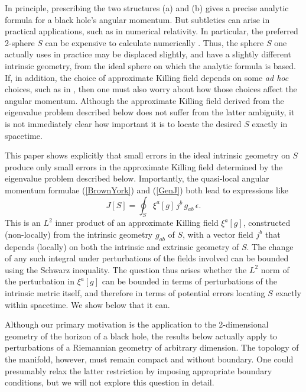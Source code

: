 \documentclass[12pt,letterpaper]{iopart}
\begin{document}
In principle, prescribing the two structures (a) and (b) gives a precise analytic formula for a black hole's angular momentum.  But subtleties can arise in practical applications, such as in numerical relativity.  In particular, the preferred 2-sphere $S$ can be expensive to calculate numerically \cite{Thornburg}.  Thus, the sphere $S$ one actually uses in practice may be displaced slightly, and have a slightly different intrinsic geometry, from the ideal sphere on which the analytic formula is based.  If, in addition, the choice of approximate Killing field depends on some \textit{ad hoc} choices, such as in \cite{Dreyer,Harte}, then one must also worry about how those choices  affect the angular momentum.  Although the approximate Killing field derived from the eigenvalue problem described below does not suffer from the latter ambiguity, it is not immediately clear how important it is to locate the desired $S$ exactly in spacetime.

This paper shows explicitly that small errors in the ideal intrinsic geometry on $S$ produce only small errors in the approximate Killing field determined by the eigenvalue problem described below.  Importantly, the quasi-local angular momentum formulae (\ref{BrownYork}) and (\ref{GenJ}) both lead to expressions like  
%
\begin{equation}
	J[S] = \oint_S \xi^a[g]\, j^b\, g_{ab}\, \epsilon.
\end{equation}
%
This is an $L^2$ inner product of an approximate Killing field $\xi^a[g]$, constructed (non-locally) from the intrinsic geometry $g_{ab}$ of $S$, with a vector field $j^b$ that depends (locally) on both the intrinsic and extrinsic geometry of $S$.  The change of any such integral under perturbations of the fields involved can be bounded using the Schwarz inequality.  The question thus arises whether the $L^2$ norm of the perturbation in $\xi^a[g]$ can be bounded in terms of perturbations of the intrinsic metric itself, and therefore in terms of potential errors locating $S$ exactly within spacetime.  We show below that it can.

Although our primary motivation is the application to the 2-dimensional geometry of the horizon of a black hole, the results below actually apply to perturbations of a Riemannian geometry of arbitrary dimension.  The topology of the manifold, however, must remain compact and without boundary.  One could presumably relax the latter restriction by imposing appropriate boundary conditions, but we will not explore this question in detail.
\end{document}

